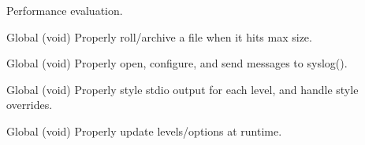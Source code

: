 \begin{DoxyRefList}
%
Performance evaluation.  
\item[Global \doxylink{group__tests_ga1b17632b25d61e85f6ff1fa08371959e}{sirtest\+\_\+rollandarchivefile} (void)]\label{test__test000015}%
%
Properly roll/archive a file when it hits max size.  
\item[Global \doxylink{group__tests_ga8db924f756e0ee2f04ff3e044a10f283}{sirtest\+\_\+syslog} (void)]\label{test__test000020}%
%
Properly open, configure, and send messages to syslog().  
\item[Global \doxylink{group__tests_ga18ccd68f2c37d9798a06c403380c9308}{sirtest\+\_\+textstylesanity} (void)]\label{test__test000017}%
%
Properly style stdio output for each level, and handle style overrides.  
\item[Global \doxylink{group__tests_gaf3428b620d3540baf058f6b7dd42c075}{sirtest\+\_\+updatesanity} (void)]\label{test__test000019}%
%
Properly update levels/options at runtime. 
\end{DoxyRefList}